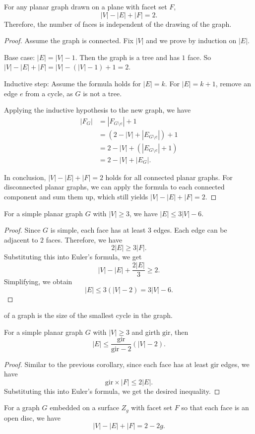 \begin{theorem}
	For any planar graph drawn on a plane with facet set $F$,
	\[ |V| - |E| + |F| = 2. \]
	Therefore, the number of faces is independent of the drawing of the graph.
\end{theorem}
\begin{proof}
	Assume the graph is connected.
	Fix $|V|$ and we prove by induction on $|E|$.

	Base case: $|E| = |V|-1$. Then the graph is a tree and has $1$ face. So $|V| - |E| + |F| = |V| - (|V|-1) + 1 = 2$.

	Inductive step: Assume the formula holds for $|E| = k$. For $|E| = k+1$, remove an edge $e$ from a cycle, as $G$ is not a tree.

	Applying the inductive hypothesis to the new graph, we have
	\begin{align*}
		|F_G| & = |F_{G\setminus e}| + 1             \\
		      & = (2 - |V| + |E_{G\setminus e}|) + 1 \\
		      & = 2 - |V| + (|E_{G\setminus e}| + 1) \\
		      & = 2 - |V| + |E_G|.
	\end{align*}

	In conclusion, $|V| - |E| + |F| = 2$ holds for all connected planar graphs. For disconnected planar graphs, we can apply the formula to each connected component and sum them up, which still yields $|V| - |E| + |F| = 2$.
\end{proof}


\begin{corollary}
	For a simple planar graph $G$ with $|V|\ge 3$, we have $|E|\le 3|V|-6$.
\end{corollary}
\begin{proof}
	Since $G$ is simple, each face has at least $3$ edges. Each edge can be adjacent to $2$ faces. Therefore, we have
	\[
		2|E| \ge 3|F|.
	\]
	Substituting this into Euler's formula, we get
	\[
		|V| - |E| + \frac{2|E|}{3} \ge 2.
	\]
	Simplifying, we obtain
	\[
		|E| \le 3(|V|-2) = 3|V|-6.
	\]
\end{proof}

\begin{definition}[Girth]
	 of a graph is the size of the smallest cycle in the graph.
\end{definition}

\begin{corollary}
	For a simple planar graph $G$ with $|V| \ge 3$ and girth $\text{gir}$, then
	\[ |E| \le \frac{\text{gir}}{\text{gir}-2}(|V|-2). \]
\end{corollary}
\begin{proof}
	Similar to the previous corollary, since each face has at least $\text{gir}$ edges, we have
	\[
		\text{gir} \times |F| \le 2|E|.
	\]
	Substituting this into Euler's formula, we get the desired inequality.
\end{proof}

\begin{theorem}
	For a graph $G$ embedded on a surface $Z_g$ with facet set $F$ so that each face is an open disc, we have
	\[ |V| - |E| + |F| = 2 - 2g. \]
\end{theorem}
